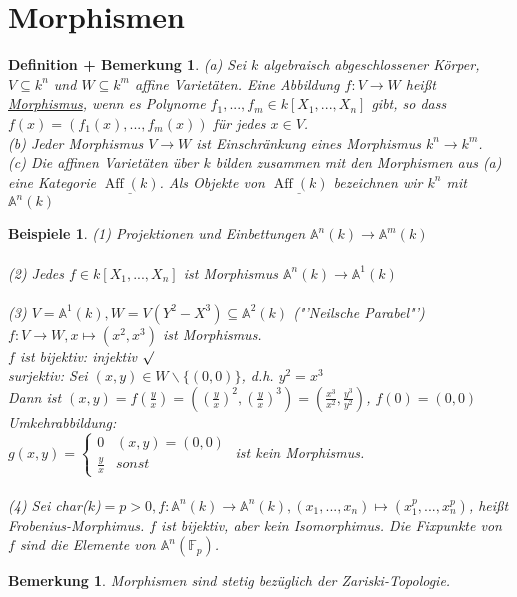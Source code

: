 \documentclass[a4paper,12pt]{report}
\theoremstyle{break}
\newtheorem{DefBem}[Def]{Definition + Bemerkung}
\newtheorem{Bem}[Def]{Bemerkung}
\newtheorem{Bsp}[Def]{Beispiele}
\theoremstyle{nonumberbreak}
\theoremstyle{nonumberplain}
\begin{document}
\section{Morphismen}
\begin{DefBem}
(a) Sei $k$ algebraisch abgeschlossener Körper, $V\subseteq k^n$ und $W\subseteq k^m$ affine Varietäten. Eine Abbildung $f:V\rightarrow W$ heißt \underline{Morphismus}, wenn es Polynome $f_1,...,f_m\in k[X_1,...,X_n]$ gibt, so dass $f(x)=(f_1(x),...,f_m(x))$ für jedes $x\in V$.\\
(b) Jeder Morphismus $V\rightarrow W$ ist Einschränkung eines Morphismus $k^n\rightarrow k^m$.\\
(c) Die affinen Varietäten über $k$ bilden zusammen mit den Morphismen aus (a) eine Kategorie $\underline{\operatorname{Aff}(k)}$. Als Objekte von $\underline{\operatorname{Aff}(k)}$ bezeichnen wir $k^n$ mit $\mathbb{A}^n(k)$ 
\end{DefBem}
\begin{Bsp}
(1) Projektionen und Einbettungen $\mathbb{A}^n(k) \rightarrow\mathbb{A}^m(k)$\\\\
(2) Jedes $f\in k[X_1,...,X_n]$ ist Morphismus $\mathbb{A}^n(k)\rightarrow\mathbb{A}^1(k)$\\\\
(3) $V= \mathbb{A}^1(k), W=V(Y^2-X^3)\subseteq \mathbb{A}^2(k)$ ("'Neilsche Parabel"')\\
$f: V\rightarrow W, x\mapsto (x^2,x^3)$ ist Morphismus.\\
$f$ ist bijektiv: injektiv $\surd$\\
surjektiv: Sei $(x,y)\in W\backslash\{(0,0)\}$, d.h. $y^2=x^3$\\
Dann ist $(x,y)= f(\frac{y}{x})= ((\frac{y}{x})^2,(\frac{y}{x})^3)=(\frac{x^3}{x^2},\frac{y^3}{y^2})$, $f(0) = (0,0)$\\
Umkehrabbildung:\\
$g(x,y)=\begin{cases}
0&(x,y)=(0,0)\\
\frac{y}{x}&sonst
\end{cases}$
ist kein Morphismus.\\\\
(4) Sei char($k$)$=p>0, f:\mathbb{A}^n(k)\rightarrow\mathbb{A}^n(k), (x_1,...,x_n)\mapsto (x_1^p,...,x_n^p)$, heißt Frobenius-Morphimus. $f$ ist bijektiv, aber kein Isomorphimus. Die Fixpunkte von $f$ sind die Elemente von $\mathbb{A}^n(\mathbb{F}_p)$.
\end{Bsp}
\begin{Bem}
\label{bem:5.3}
Morphismen sind stetig bezüglich der Zariski-Topologie.
\end{Bem}
\end{document}

